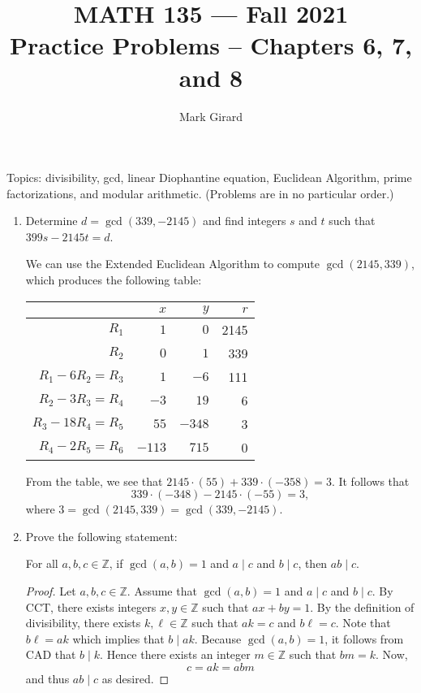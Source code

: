 \documentclass[11pt]{article}
\def\integers{\mathbb{Z}}
\newif\ifshowsolution
\begin{document}
\title{MATH 135 --- Fall 2021\\ Practice Problems \ifshowsolution(Solutions)\fi -- Chapters 6, 7, and 8}
\author{Mark Girard}

\maketitle

Topics: divisibility, gcd, linear Diophantine equation, Euclidean Algorithm, prime factorizations, and modular arithmetic. (Problems are in no particular order.)
 
\begin{enumerate}%
 \item Determine $d=\gcd(339,-2145)$ and find integers $s$ and $t$ such that $399s-2145t = d$.

\begin{Solution}
We can use the Extended Euclidean Algorithm to compute $\gcd(2145,339)$, which produces the following table:
\begin{center}
\begin{tabular}{|r|r|r|r|}
\hline
 & $x$ & $y$ & $r$\\\hline
 $R_1$             &   $1$ &   $0$ & 2145\\
 $R_2$             &   $0$ &   $1$ &  339\\
 $R_1 -6R_2 = R_3$ &   $1$ &  $-6$ &  111\\
 $R_2 -3R_3 = R_4$ &  $-3$ &  $19$ &   6\\
 $R_3-18R_4 = R_5$ &  $55$ &$-348$ &   3\\
 $R_4 -2R_5 = R_6$ &$-113$ & $715$ &   0\\\hline
\end{tabular}
\end{center}
From the table, we see that $2145\cdot(55) + 339\cdot(-358) = 3$. It follows that 
\[
 339\cdot (-348) -2145\cdot(-55) =3,
\]
where $3=\gcd(2145,339) = \gcd(339,-2145)$.
\end{Solution}


\item Prove the following statement: 
\begin{center}
 For all $a,b,c\in\integers$, if $\gcd(a,b)=1$ and $a\mid c$ and $b\mid c$, then $ab\mid c$. 
\end{center}

\begin{Solution}
 \begin{proof}
  Let $a,b,c\in\integers$. Assume that $\gcd(a,b)=1$ and $a\mid c$ and $b\mid c$. By CCT, there exists integers $x,y\in\integers$ such that $ax+by = 1$. By the definition of divisibility, there exists $k,\ell\in\integers$ such that $ak=c$ and $b\ell  = c$. Note that $b\ell  = ak$ which implies that $b\mid ak$. Because $\gcd(a,b)=1$, it follows from CAD that $b\mid k$. Hence there exists an integer $m\in\integers$ such that $bm=k$. Now,
  \[
   c = ak = abm 
  \]
and thus $ab\mid c$ as desired.
 \end{proof}


\end{Solution}
\end{enumerate}
\end{document}
